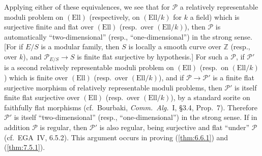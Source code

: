 Applying either of these equivalences, we see that for $\mathcal{P}$ a relatively representable moduli problem on $(\mathrm{Ell})$ (respectively, on $(\mathrm{Ell}/k)$ for $k$ a field) which is surjective finite and flat over $(\mathrm{Ell})$ (resp.~over $(\mathrm{Ell}/k)$), then $\mathcal{P}$ is automatically ``two-dimensional'' (resp., ``one-dimensional'') in the strong sense. [For if $E/S$ is a modular family, then $S$ is locally a smooth curve over $\mathbb{Z}$ (resp., over $k$), and $\mathcal{P}_{E/S} \to S$ is finite flat surjective by hypothesis.] For such a $\mathcal{P}$, if $\mathcal{P}'$ is a second relatively representable moduli problem on $(\mathrm{Ell})$ (resp.~on $(\mathrm{Ell}/k)$) which is finite over $(\mathrm{Ell})$ (resp.~over $(\mathrm{Ell}/k)$), and if $\mathcal{P} \to \mathcal{P}'$ is a finite flat surjective morphism of relatively representable moduli problems, then $\mathcal{P}'$ is itself finite flat surjective over $(\mathrm{Ell})$ (resp.~over $(\mathrm{Ell}/k)$), by a standard sorite on faithfully flat morphisms (cf.~Bourbaki, \emph{Comm.~Alg.}~I, \S3.4, Prop.~7). Therefore $\mathcal{P}'$ is itself ``two-dimensional'' (resp., ``one-dimensional'') in the strong sense. If in addition $\mathcal{P}$ is regular, then $\mathcal{P}'$ is also regular, being surjective and flat ``under'' $\mathcal{P}$ (cf.~EGA~IV, 6.5.2). This argument occurs in proving (\ref{thm:6.6.1}) and (\ref{thm:7.5.1}).

